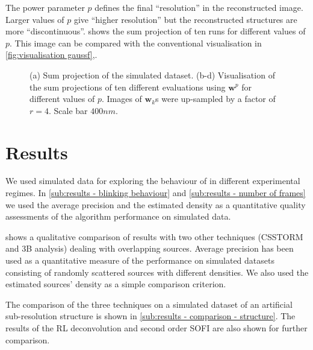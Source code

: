The power parameter $p$ defines the final ``resolution'' in the reconstructed image. Larger values of $p$ give ``higher resolution'' but the reconstructed structures are more ``discontinuous''.  shows the sum projection of ten \inmf{} runs for different values of $p$. This image can be compared with the conventional visualisation in \autoref{fig:visualisation gaussf}\ccc,\ddd. 
%
\begin{figure}[!h]
	\newcommand{\sizef}{.48}			
	\newcommand{\widthfig}{1\textwidth}	
	\centering
	\caption{(a) Sum projection of the simulated dataset. (b-d) Visualisation of the sum projections of ten different \inmf{} evaluations using $\bm{w}^p$ for different values of $p$. Images of $\bm{w}_k$s were up-sampled by a factor of $r=4$. Scale bar $400 \unit{nm}$.}
	\label{fig:demo pow w result}	
\end{figure}

\clearpage

\section{Results \label{sec:results}}
We used simulated data for exploring the behaviour of \inmf{} in different experimental regimes. In \autoref{sub:results - blinking behaviour} and \ref{sub:results - number of frames} we used the average precision and the estimated density as a quantitative quality assessments of the algorithm performance on simulated data. 

 shows a qualitative comparison of \inmf{} results with two other techniques (CSSTORM and 3B analysis) dealing with overlapping sources. Average precision has been used as a quantitative measure of the performance on simulated datasets consisting of randomly scattered sources with different densities. We also used the estimated sources' density as a simple comparison criterion. 

The comparison of the three techniques on a simulated dataset of an artificial sub-resolution structure is shown in \autoref{sub:results - comparison - structure}. The results of the RL deconvolution and second order SOFI are also shown for further comparison. 

